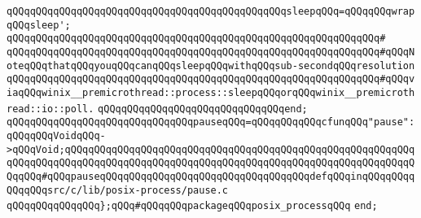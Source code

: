 \verb|qQQqqQQqqQQqqQQqqQQqqQQqqQQqqQQqqQQqqQQqqQQqqQQqsleepqQQq=qQQqqQQqwrapqQQqsleep';|\newline
\verb|qQQqqQQqqQQqqQQqqQQqqQQqqQQqqQQqqQQqqQQqqQQqqQQqqQQqqQQqqQQqqQQq#|\newline
\verb|qQQqqQQqqQQqqQQqqQQqqQQqqQQqqQQqqQQqqQQqqQQqqQQqqQQqqQQqqQQqqQQq#qQQqNoteqQQqthatqQQqyouqQQqcanqQQqsleepqQQqwithqQQqsub-secondqQQqresolution|\newline
\verb|qQQqqQQqqQQqqQQqqQQqqQQqqQQqqQQqqQQqqQQqqQQqqQQqqQQqqQQqqQQqqQQq#qQQqviaqQQqwinix__premicrothread::process::sleepqQQqorqQQqwinix__premicrothread::io::poll.|\newline
\newline
\verb|qQQqqQQqqQQqqQQqqQQqqQQqqQQqqQQqend;|\newline
\newline
\verb|qQQqqQQqqQQqqQQqqQQqqQQqqQQqqQQqpauseqQQq=qQQqqQQqqQQqcfunqQQq"pause":qQQqqQQqVoidqQQq->qQQqVoid;qQQqqQQqqQQqqQQqqQQqqQQqqQQqqQQqqQQqqQQqqQQqqQQqqQQqqQQqqQQqqQQqqQQqqQQqqQQqqQQqqQQqqQQqqQQqqQQqqQQqqQQqqQQqqQQqqQQqqQQqqQQqqQQqqQQqqQQq#qQQqpauseqQQqqQQqqQQqqQQqqQQqqQQqqQQqqQQqqQQqdefqQQqinqQQqqQQqqQQqqQQqsrc/c/lib/posix-process/pause.c|\newline
\newline
\newline
\verb|qQQqqQQqqQQqqQQq};qQQq#qQQqqQQqpackageqQQqposix_processqQQq|\newline
\verb|end;|\newline
\newline
\newline


